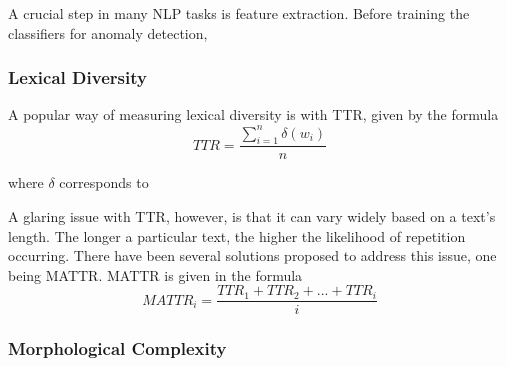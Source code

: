 \documentclass[12pt,a4paper]{article}
\numberwithin{figure}{section}
\numberwithin{table}{section}
\numberwithin{definition}{section}
\begin{document}
A crucial step in many NLP tasks is feature extraction. Before training the classifiers for anomaly detection, 

\subsubsection{Lexical Diversity}
\label{ssec:lexicaldiversity}

A popular way of measuring lexical diversity is with TTR, given by the formula \[TTR = \frac{\sum_{i=1}^{n}\delta(w_i)}{n}\]

where $\delta$ corresponds to 

A glaring issue with TTR, however, is that it can vary widely based on a text's length. The longer a particular text, the higher the likelihood of repetition occurring. There have been several solutions proposed to address this issue, one being MATTR. MATTR is given in the formula \[MATTR_i = \frac{TTR_1+TTR_2+...+TTR_i}{i}\]

\subsubsection{Morphological Complexity}
\label{ssec:morphologicalcomplexity}
\end{document}
